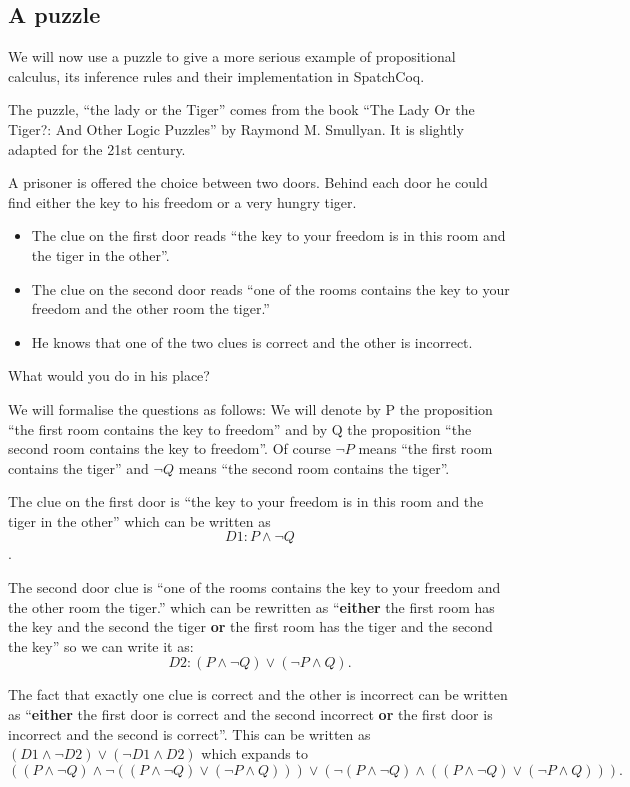 \subsection{A puzzle}

We will now use a puzzle to give a more serious example	 of propositional calculus, its inference rules and their implementation in SpatchCoq. 

The puzzle, ``the lady or the Tiger'' comes from the book  ``The Lady Or the Tiger?: And Other Logic Puzzles'' by Raymond M. Smullyan. It is slightly adapted for the 21st century.

A  prisoner is offered the choice between two doors. Behind each door he could find either the key to his freedom or a very hungry tiger.

 \begin{itemize}

 \item The clue on the first door reads ``the key to your freedom  is in this room and the tiger in the other''.
 \item The clue on the second door reads ``one of the rooms contains  the key to your freedom and the other room the tiger.''
  \item He knows that one of the two clues is correct and the other is incorrect.
 \end{itemize}

What would you do in his place?

We will formalise the questions as follows: We will denote by P the proposition  ``the first room contains the key to freedom'' and by Q the proposition ``the second room contains the key to freedom''. Of course $\neg P$ means ``the first room contains the tiger'' and  $\neg Q$ means ``the second room contains the tiger''.

The clue on the first door is ``the key to your freedom  is in this room and the tiger in the other'' which can be written as $$D1:P\land \neg Q$$.

The second door clue is ``one of the rooms contains  the key to your freedom and the other room the tiger.'' which can be rewritten as ``{\bf either} the first room has the key and the second the tiger {\bf or} the first room has the tiger and the second the key'' so we can write it as:
 $$D2 : (P\land \neg Q) \lor (\neg P \land Q).$$ 
 
 The fact that exactly one clue is correct and the other is incorrect can be written as ``{\bf either} the first door is correct and the second incorrect {\bf or} the first door is incorrect and the second is correct''. This can be written as $(D1 \land \neg D2 )\lor (\neg D1 \land D2)$ which expands to $$((P\land \neg Q)\land \neg ((P\land \neg Q) \lor (\neg P \land Q)))\lor (\neg(P\land \neg Q) \land ((P\land \neg Q) \lor (\neg P \land Q))).$$ 

